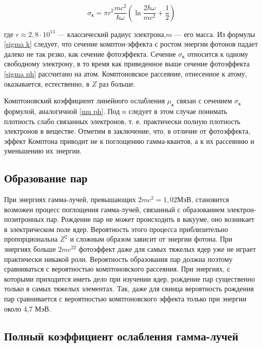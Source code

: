 \documentclass[a4paper,12pt]{article} %
\begin{document}
	\begin{equation}\label{sigma k}
	\sigma_\text{к} = \pi r^2 \dfrac{mc^2}{\hbar\omega} \left( \ln{\dfrac{2\hbar\omega}{mc^2} + \dfrac{1}{2}} \right) 
	\end{equation}
	
\noindent где $ r \approx 2,8 \cdot 10^{13} $ --- классический радиус электрона,$ m $ --- его масса. Из формулы \eqref{sigma k} следует, что сечение комптон-эффекта с ростом энергии фотонов падает далеко не так резко, как сечение фотоэффекта.
	Сечение $ \sigma_\text{к} $ относится к одному свободному электрону, в то время как приведенное выше сечение фотоэффекта \eqref{sigma ph} рассчитано на атом.
	Комптоновское рассеяние, отнесенное к атому, оказывается, естественно, в $ Z $ раз больше. 
	
	\medskip
	
\noindent Комптоновский коэффициент линейного ослабления $ \mu_\text{к} $ связан с
	сечением $ \sigma_\text{к} $ формулой, аналогичной \eqref{mu ph}. Под $ n $ следует в этом случае понимать плотность слабо связанных электронов, т. е. практически полную плотность электронов в веществе.
	Отметим в заключение, что, в отличие от фотоэффекта, эффект
	Комптона приводит не к поглощению гамма-квантов, а к их рассеянию и
	уменьшению их энергии.
	
	\subsection{Образование пар}
	
\noindent При энергиях гамма-лучей, превышающих $ 2mc^2 = 1,02  $МэВ, становится возможен процесс поглощения гамма-лучей, связанный с образованием электрон-позитронных пар. Рождение пар не
	может происходить в вакууме, оно возникает в электрическом поле
	ядер. Вероятность этого процесса приблизительно пропорциональна
	$ Z^2  $ и сложным образом зависит от энергии фотона. При энергиях больше $ 2mc^22  $ фотоэффект даже для самых тяжелых ядер уже не играет
	практически никакой роли. Вероятность образования пар должна поэтому сравниваться с вероятностью комптоновского рассеяния. При
	энергиях, с которыми приходится иметь дело при изучении ядер, рождение пар существенно только в самых тяжелых элементах. Так, даже
	для свинца вероятность рождения пар сравнивается с вероятностью
	комптоновского эффекта только при энергии около 4,7 МэВ.
	
	\subsection{Полный коэффициент ослабления гамма-лучей}
	
\end{document}
